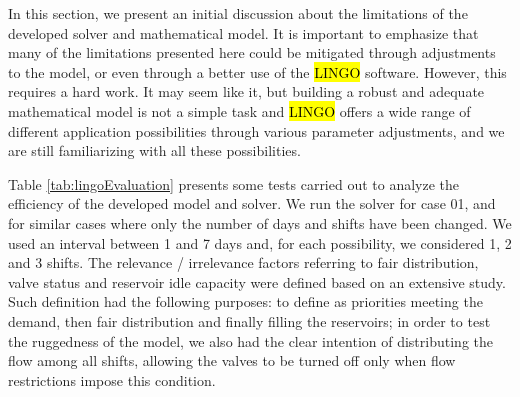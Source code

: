 \documentclass{singlecol}
\theoremstyle{TH}{
\newtheorem{lemma}{Lemma}
\newtheorem{theorem}[lemma]{Theorem}
\newtheorem{corrolary}[lemma]{Corrolary}
\newtheorem{conjecture}[lemma]{Conjecture}
\newtheorem{proposition}[lemma]{Proposition}
\newtheorem{claim}[lemma]{Claim}
\newtheorem{stheorem}[lemma]{Wrong Theorem}
\newtheorem{algorithm}{Algorithm}
}
\theoremstyle{THrm}{
\newtheorem{definition}{Definition}[section]
\newtheorem{question}{Question}[section]
\newtheorem{remark}{Remark}
\newtheorem{scheme}{Scheme}
}
\theoremstyle{THhit}{
\newtheorem{case}{Case}[section]
}
\begin{document}
In this section, we present an initial discussion about the limitations of the developed solver and mathematical model. It is important to emphasize that many of the limitations presented here could be mitigated through adjustments to the model, or even through a better use of the \hl{LINGO} software. However, this requires a hard work. It may seem like it, but building a robust and adequate mathematical model is not a simple task and \hl{LINGO} offers a wide range of different application possibilities through various parameter adjustments, and we are still familiarizing with all these possibilities. 

Table \ref{tab:lingoEvaluation} presents some tests carried out to analyze the efficiency of the developed model and solver. We run the solver for case 01, and for similar cases where only the number of days and shifts have been changed. We used an interval between 1 and 7 days and, for each possibility, we considered 1, 2 and 3 shifts. The relevance / irrelevance factors referring to fair distribution, valve status and reservoir idle capacity were defined based on an extensive study. Such definition had the following purposes: to define as priorities meeting the demand, then fair distribution and finally filling the reservoirs; in order to test the ruggedness of the model, we also had the clear intention of distributing the flow among all shifts, allowing the valves to be turned off only when flow restrictions impose this condition. 
\end{document}
